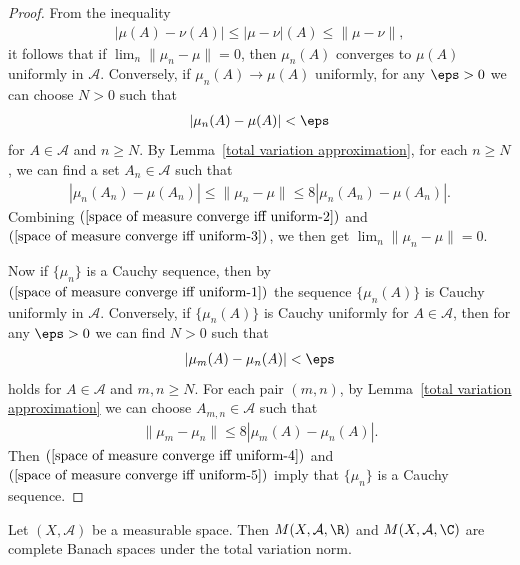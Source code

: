 \begin{proof}
From the inequality
\begin{align}\label{space of measure converge iff uniform-1}
|\mu(A)-\nu(A)|\leq|\mu-\nu|(A)\leq\|\mu-\nu\|,
\end{align}
it follows that if $\lim_n\|\mu_n-\mu\|=0$, then $\mu_n(A)$ converges to $\mu(A)$ uniformly in $\mathcal{A}$. Conversely, if $\mu_n(A)\to\mu(A)$ uniformly, for any $\eps>0$ we can choose $N>0$ such that
\begin{align}\label{space of measure converge iff uniform-2}
|\mu_n(A)-\mu(A)|<\eps
\end{align}
for $A\in\mathcal{A}$ and $n\geq N$. By Lemma~\ref{total variation approximation}, for each $n\geq N$, we can find a set $A_n\in\mathcal{A}$ such that
\begin{align}\label{space of measure converge iff uniform-3}
|\mu_n(A_n)-\mu(A_n)|\leq\|\mu_n-\mu\|\leq 8|\mu_n(A_n)-\mu(A_n)|.
\end{align}
Combining $(\ref{space of measure converge iff uniform-2})$ and $(\ref{space of measure converge iff uniform-3})$, we then get $\lim_n\|\mu_n-\mu\|=0$.\par
Now if $\{\mu_n\}$ is a Cauchy sequence, then by $(\ref{space of measure converge iff uniform-1})$ the sequence $\{\mu_n(A)\}$ is Cauchy uniformly in $\mathcal{A}$. Conversely, if $\{\mu_n(A)\}$ is Cauchy uniformly for $A\in\mathcal{A}$, then for any $\eps>0$ we can find $N>0$ such that
\begin{align}\label{space of measure converge iff uniform-4}
|\mu_m(A)-\mu_n(A)|<\eps
\end{align}
holds for $A\in\mathcal{A}$ and $m,n\geq N$. For each pair $(m,n)$, by Lemma~\ref{total variation approximation} we can choose $A_{m,n}\in\mathcal{A}$ such that
\begin{align}\label{space of measure converge iff uniform-5}
\|\mu_m-\mu_n\|\leq 8|\mu_m(A)-\mu_n(A)|.
\end{align}
Then $(\ref{space of measure converge iff uniform-4})$ and $(\ref{space of measure converge iff uniform-5})$ imply that $\{\mu_n\}$ is a Cauchy sequence.
\end{proof}
\begin{proposition}\label{space of measure is complete}
Let $(X,\mathcal{A})$ be a measurable space. Then $M(X,\mathcal{A},\R)$ and $M(X,\mathcal{A},\C)$ are complete Banach spaces under the total variation norm.
\end{proposition}
